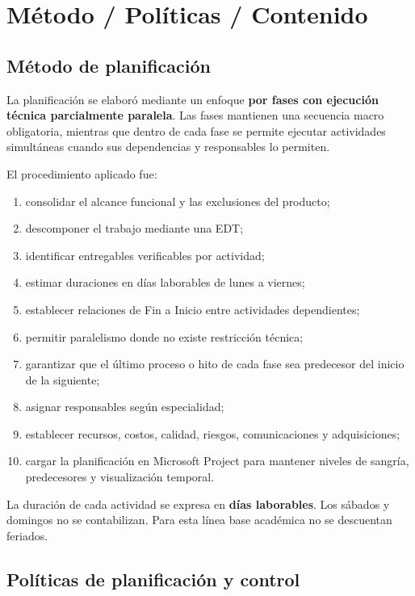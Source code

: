 \documentclass[12pt,a4paper]{article}
\begin{document}
\section{Método / Políticas / Contenido}

\subsection{Método de planificación}

La planificación se elaboró mediante un enfoque \textbf{por fases con ejecución técnica parcialmente paralela}. Las fases mantienen una 
secuencia macro obligatoria, mientras que dentro de cada fase se permite ejecutar actividades simultáneas cuando sus dependencias y 
responsables lo permiten.

El procedimiento aplicado fue:

\begin{enumerate}
    \item consolidar el alcance funcional y las exclusiones del producto;
    \item descomponer el trabajo mediante una EDT;
    \item identificar entregables verificables por actividad;
    \item estimar duraciones en días laborables de lunes a viernes;
    \item establecer relaciones de Fin a Inicio entre actividades dependientes;
    \item permitir paralelismo donde no existe restricción técnica;
    \item garantizar que el último proceso o hito de cada fase sea predecesor del inicio de la siguiente;
    \item asignar responsables según especialidad;
    \item establecer recursos, costos, calidad, riesgos, comunicaciones y adquisiciones;
    \item cargar la planificación en Microsoft Project para mantener niveles de sangría, predecesores y visualización temporal.
\end{enumerate}

La duración de cada actividad se expresa en \textbf{días laborables}. Los sábados y domingos no se contabilizan. Para esta línea base 
académica no se descuentan feriados.

\subsection{Políticas de planificación y control}
\end{document}
